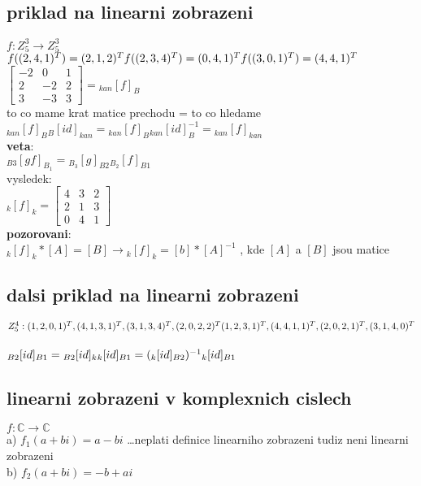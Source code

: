 \documentclass[a4paper]{article}
\begin{document}
\subsection{priklad na linearni zobrazeni}
$f:Z^3_5 \rightarrow Z^3_5$\\
$
f((2,4,1)^T) = (2,1,2)^T\\
f((2,3,4)^T) = (0,4,1)^T\\
f((3,0,1)^T) = (4,4,1)^T\\
$\\
$
\begin{bmatrix}
	-2 & 0 & 1 \\
	2 & -2 & 2 \\
	3 & -3 & 3 
\end{bmatrix}
= {}_{kan}[f]_B
$\\to co mame krat matice prechodu = to co hledame\\ 
$
{}_{kan}[f]_B {}_B[id]_{kan} = 
{}_{kan}[f]_B {}_{kan}[id]_B^{-1} = 
{}_{kan}[f]_{kan}
$\\\textbf{veta}:\\
$
{}_{B3}[gf]_{B_1} =
{}_{B_3}[g]_{B2} {}_{B_2}[f]_{B1} 
$\\vysledek:\\
$
{}_k[f]_k = 
\begin{bmatrix}
	4 & 3 & 2 \\
	2 & 1 & 3 \\
	0 & 4 & 1 
\end{bmatrix}
$\\\textbf{pozorovani}:\\
$
{}_k[f]_k * [A] = [B] \rightarrow {}_k[f]_k = [b] * [A]^{-1} 
$ , kde $[A]$ a $[B]$ jsou matice

\subsection{dalsi priklad na linearni zobrazeni}
$
Z^4_5 : (1,2,0,1)^T, (4,1,3,1)^T, (3,1,3,4)^T, (2,0,2,2)^T\\
		(1,2,3,1)^T, (4,4,1,1)^T, (2,0,2,1)^T, (3,1,4,0)^T
$\\\\
$
{}_{B2}[id]_{B1} = {}_{B2}[id]_k {}_k[id]_{B1}\\
= ({}_k[id]_{B2})^{-1} {}_k[id]_{B1}
$

\subsection{linearni zobrazeni v komplexnich cislech}
$f:\mathbb{C} \rightarrow \mathbb{C}$\\
a) $f_1(a+bi) = a - bi$ \dots neplati definice linearniho zobrazeni tudiz neni linearni zobrazeni\\
b) $f_2(a+bi) = -b + ai$\\
\end{document}
